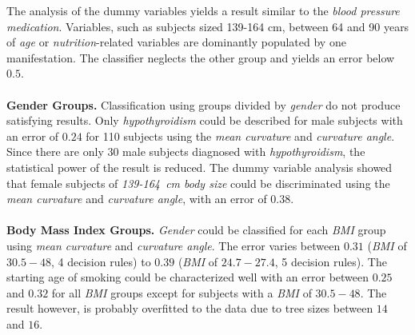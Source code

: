 \documentclass[a4paper,twoside]{style/article}
\begin{document}
The analysis of the dummy variables yields a result similar to the \emph{blood pressure medication}.
Variables, such as subjects sized 139-164 cm, between 64 and 90 years of \emph{age} or \emph{nutrition}-related variables are dominantly populated by one manifestation.
The classifier neglects the other group and yields an error below $0.5$.
\\\\
\noindent \textbf{Gender Groups.}
Classification using groups divided by \emph{gender} do not produce satisfying results.
Only \emph{hypothyroidism} could be described for male subjects with an error of $0.24$ for 110 subjects using the \emph{mean curvature} and \emph{curvature angle}.
Since there are only 30 male subjects diagnosed with \emph{hypothyroidism}, the statistical power of the result is reduced.
The dummy variable analysis showed that female subjects of \emph{139-164~cm body size} could be discriminated using the \emph{mean curvature} and \emph{curvature angle}, with an error of $0.38$.
\\\\
\noindent \textbf{Body Mass Index Groups.}
\emph{Gender} could be classified for each \emph{BMI} group using \emph{mean curvature} and \emph{curvature angle}.
The error varies between $0.31$ (\emph{BMI} of \emph{$30.5-48$}, 4 decision rules) to $0.39$ (\emph{BMI} of \emph{$24.7-27.4$}, 5 decision rules).
The starting age of smoking could be characterized well with an error between $0.25$ and $0.32$ for all \emph{BMI} groups except for subjects with a \emph{BMI} of \emph{$30.5-48$}.
The result however, is probably overfitted to the data due to tree sizes between $14$ and $16$.
\end{document}
